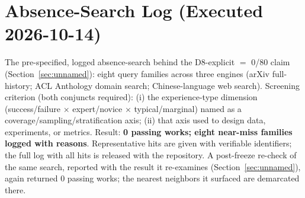 \documentclass[10pt]{article}
\begin{document}
\appendix

\section{Absence-Search Log (Executed 2026-10-14)}\label{sec:appendix-absence}

The pre-specified, logged absence-search behind the D8-explicit $=$ 0/80 claim (Section~\ref{sec:unnamed}): eight query families across three engines (arXiv full-history; ACL Anthology domain search; Chinese-language web search). Screening criterion (both conjuncts required): (i) the experience-type dimension (success/failure $\times$ expert/novice $\times$ typical/marginal) named as a coverage/sampling/stratification axis; (ii) that axis used to design data, experiments, or metrics. Result: \textbf{0 passing works; eight near-miss families logged with reasons}. Representative hits are given with verifiable identifiers; the full log with all hits is released with the repository. A post-freeze re-check of the same search, reported with the result it re-examines (Section~\ref{sec:unnamed}), again returned 0 passing works; the nearest neighbors it surfaced are demarcated there.
\end{document}
